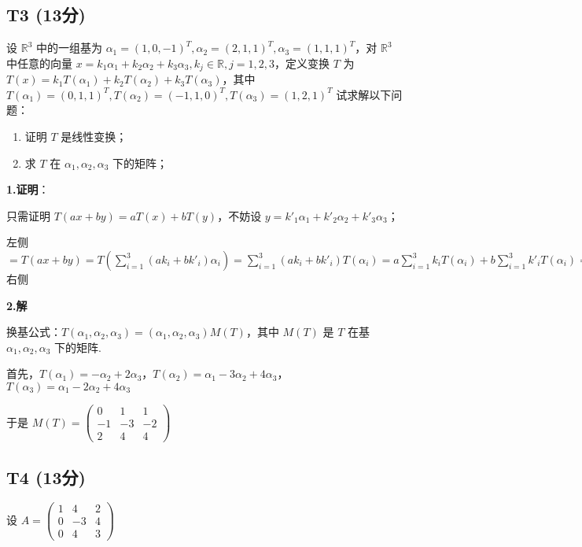 \documentclass{article}
\begin{document}
\subsection{T3 (13分)}

\par 设 $\mathbb R^3$ 中的一组基为 $\alpha_1=(1, 0, -1)^T, \alpha_2=(2, 1, 1)^T, \alpha_3=(1, 1, 1)^T$，对 $\mathbb R^3$ 中任意的向量 $x=k_1\alpha_1 + k_2\alpha_2+k_3\alpha_3, k_j\in\mathbb R, j=1, 2, 3$，定义变换 $T$ 为 $T(x)=k_1T(\alpha_1)+k_2T(\alpha_2)+k_3T(\alpha_3)$，其中 $T(\alpha_1)=(0, 1, 1)^T, T(\alpha_2)=(-1, 1, 0)^T, T(\alpha_3)=(1, 2, 1)^T$ 试求解以下问题：

\begin{enumerate}
	\item 证明 $T$ 是线性变换；
	\item 求 $T$ 在 $\alpha_1, \alpha_2, \alpha_3$ 下的矩阵；
\end{enumerate}

\par \textbf{1.证明}：

只需证明 $T(ax + by)=aT(x)+bT(y)$，不妨设 $y=k'_1\alpha_1+k'_2\alpha_2+k'_3\alpha_3$；

左侧 $=T(ax+by)=T(\sum_{i=1}^3(ak_i + bk'_i)\alpha_i)=\sum_{i=1}^3(ak_i + bk'_i)T(\alpha_i)=a\sum_{i=1}^3k_iT(\alpha_i)+b\sum_{i=1}^3 k'_iT(\alpha_i)=$ 右侧

\par \textbf{2.解}

换基公式：$T(\alpha_1, \alpha_2, \alpha_3)=(\alpha_1, \alpha_2, \alpha_3) M(T)$，其中 $M(T)$ 是 $T$ 在基 $\alpha_1, \alpha_2, \alpha_3$ 下的矩阵.

首先，$T(\alpha_1)=-\alpha_2+2\alpha_3$，$T(\alpha_2)=\alpha_1-3\alpha_2+4\alpha_3$， $T(\alpha_3)=\alpha_1-2\alpha_2+4\alpha_3$

于是 $M(T)=\begin{pmatrix}
	0 & 1 & 1\\
	-1 & -3 & -2\\
	2 & 4 & 4
\end{pmatrix}$

\subsection{T4 (13分)}

\par 设 $A=\begin{pmatrix}
	1 & 4 & 2\\
	0 & -3 & 4\\
	0 & 4 & 3
\end{pmatrix}$
\end{document}
